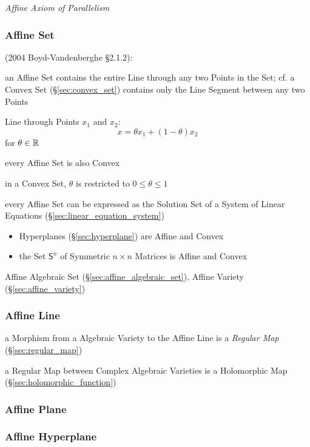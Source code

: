 \emph{Affine Axiom of Parallelism}



\subsubsection{Affine Set}\label{sec:affine_set}

(2004 Boyd-Vandenberghe \S2.1.2):

an Affine Set contains the entire Line through any two Points in the Set; cf. a
Convex Set (\S\ref{sec:convex_set}) contains only the Line Segment between any
two Points

Line through Points $x_1$ and $x_2$:
\[
  x = \theta x_1 + (1-\theta) x_2
\]
for $\theta \in \mathbb{R}$

every Affine Set is also Convex

\fist in a Convex Set, $\theta$ is restricted to $0 \leq \theta \leq 1$

every Affine Set can be expressed as the Solution Set of a System of Linear
Equations (\S\ref{sec:linear_equation_system})

\begin{itemize}
  \item Hyperplanes (\S\ref{sec:hyperplane}) are Affine and Convex
  \item the Set $\mathsf{S}^n$ of Symmetric $n \times n$ Matrices is Affine and
    Convex
\end{itemize}

\fist Affine Algebraic Set (\S\ref{sec:affine_algebraic_set}), Affine Variety
(\S\ref{sec:affine_variety})



\subsubsection{Affine Line}\label{sec:affine_line}

a Morphism from a Algebraic Variety to the Affine Line is a \emph{Regular Map}
(\S\ref{sec:regular_map})

a Regular Map between Complex Algebraic Varieties is a Holomorphic Map
(\S\ref{sec:holomorphic_function})



\subsubsection{Affine Plane}\label{sec:affine_plane}

\subsubsection{Affine Hyperplane}\label{sec:affine_hyperplane}

